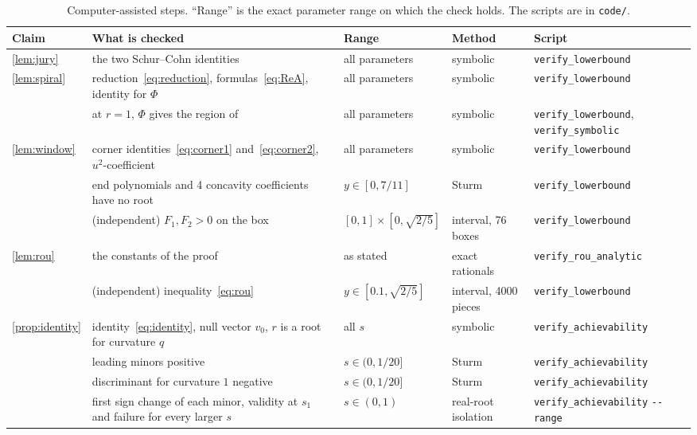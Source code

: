 \documentclass[11pt, a4paper]{article}
\newcommand{\file}{\nolinkurl}  %
\theoremstyle{definition}
\begin{document}
\begin{table}[ht]
  \centering
  \caption{Computer-assisted steps. ``Range'' is the exact parameter range on which the check holds. The scripts are in
    \texttt{code/}.}
  \label{tab:computer}
  \footnotesize
  \setlength{\tabcolsep}{4pt}
  \begin{tabular}{>{\raggedright\arraybackslash}p{1.7cm}>{\raggedright\arraybackslash}p{4.1cm}>{\raggedright\arraybackslash}p{2.95cm}>{\raggedright\arraybackslash}p{1.5cm}>{\raggedright\arraybackslash\scriptsize}p{3.5cm}}
    \toprule
    Claim & What is checked & Range & Method & Script \\
    \midrule
    \cref{lem:jury} & the two Schur--Cohn identities & all parameters & symbolic & \file{verify_lowerbound} \\
    \cref{lem:spiral} & reduction~\eqref{eq:reduction}, formulas~\eqref{eq:ReA}, identity for $\Phi$ & all parameters & symbolic & \file{verify_lowerbound} \\
    & at $r=1$, $\Phi$ gives the region of \citet[Thm.~3.5]{goujaud2025provable} & all parameters & symbolic & \file{verify_lowerbound}, \file{verify_symbolic} \\
    \cref{lem:window} & corner identities~\eqref{eq:corner1} and~\eqref{eq:corner2}, $u^2$-coefficient & all parameters & symbolic & \file{verify_lowerbound} \\
    & 8 end polynomials and 4 concavity coefficients have no root & $y\in[0,7/11]$ & Sturm & \file{verify_lowerbound} \\
    & (independent) $F_1,F_2>0$ on the box & $[0,1]\times[0,\sqrt{2/5}]$ & interval, 76 boxes & \file{verify_lowerbound} \\
    \cref{lem:rou} & the constants of the proof & as stated & exact rationals & \file{verify_rou_analytic} \\
    & (independent) inequality~\eqref{eq:rou} & $y\in[0.1,\sqrt{2/5}]$ & interval, 4000 pieces & \file{verify_lowerbound} \\
    \cref{prop:identity} & identity~\eqref{eq:identity}, null vector $v_0$, $r$ is a root for curvature $q$ & all $s$ & symbolic & \file{verify_achievability} \\
    & 6 leading minors positive & $s\in(0,1/20]$ & Sturm & \file{verify_achievability} \\
    & discriminant for curvature $1$ negative & $s\in(0,1/20]$ & Sturm & \file{verify_achievability} \\
    & first sign change of each minor, validity at $s_1$ and failure for every larger $s$ & $s\in(0,1)$ & real-root isolation & \file{verify_achievability} \texttt{-{}-range} \\

\end{tabular}
\end{table}
\end{document}
